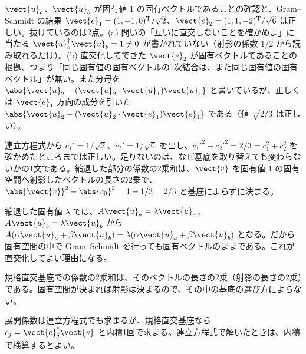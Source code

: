 \begin{kotaeran}
   $\vect{u}_{a}$、$\vect{u}_{b}$ が固有値 $1$ の固有ベクトルであることの確認と、Gram--Schmidt の結果 $\vect{e}_{1}=(1,-1,0)^{\mathrm{T}}/\sqrt{2}$、$\vect{e}_{2}=(1,1,-2)^{\mathrm{T}}/\sqrt{6}$ は正しい。抜けているのは2点。(a) 問いの「互いに直交しないことを確かめよ」に当たる $\vect{u}_{a}^{\dagger}\vect{u}_{b}=1\neq0$ が書かれていない（射影の係数 $1/2$ から読み取れるだけ）。(b) 直交化してできた $\vect{e}_{2}$ が固有ベクトルであることの根拠、つまり「同じ固有値の固有ベクトルの1次結合は、また同じ固有値の固有ベクトル」が無い。また分母を $\abs{\vect{u}_{2}-(\vect{u}_{2}\cdot\vect{u}_{1})\vect{u}_{1}}$ と書いているが、正しくは $\vect{e}_{1}$ 方向の成分を引いた $\abs{\vect{u}_{2}-(\vect{u}_{2}\cdot\vect{e}_{1})\vect{e}_{1}}$ である（値 $\sqrt{2/3}$ は正しい）。

   連立方程式から $c_{1}'=1/\sqrt{2}$、$c_{2}'=1/\sqrt{6}$ を出し、$c_{1}'^{2}+c_{2}'^{2}=2/3=c_{1}^{2}+c_{2}^{2}$ を確かめたところまでは正しい。足りないのは、なぜ基底を取り替えても変わらないかの1文である。縮退した部分の係数の2乗和は、$\vect{v}$ を固有値 $1$ の固有空間へ射影したベクトルの長さの2乗で、$\abs{\vect{v}}^{2}-\abs{c_{0}}^{2}=1-1/3=2/3$ と基底によらずに決まる。
\end{kotaeran}
\begin{rikai}
  \item 縮退した固有値 $\lambda$ では、$A\vect{u}_{a}=\lambda\vect{u}_{a}$、$A\vect{u}_{b}=\lambda\vect{u}_{b}$ から $A(\alpha\vect{u}_{a}+\beta\vect{u}_{b})=\lambda(\alpha\vect{u}_{a}+\beta\vect{u}_{b})$ となる。だから固有空間の中で Gram--Schmidt を行っても固有ベクトルのままである。これが直交化してよい理由になる。
  \item 規格直交基底での係数の2乗和は、そのベクトルの長さの2乗（射影の長さの2乗）である。固有空間が決まれば射影は決まるので、その中の基底の選び方によらない。
  \item 展開係数は連立方程式でも求まるが、規格直交基底なら $c_{j}=\vect{e}_{j}^{\dagger}\vect{v}$ と内積1回で求まる。連立方程式で解いたときは、内積で検算するとよい。
\end{rikai}

